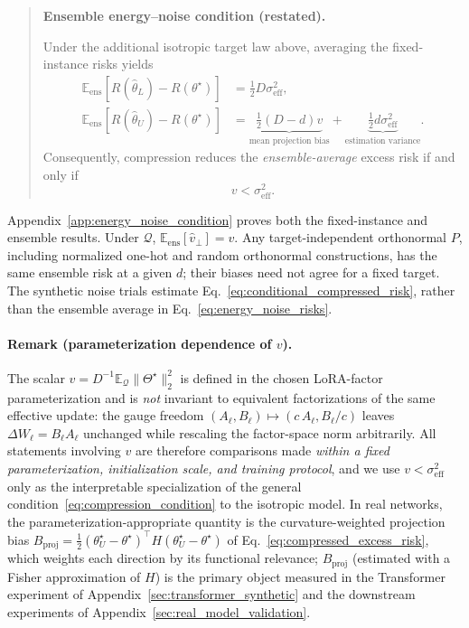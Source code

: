 \begin{quote}\textbf{Ensemble energy--noise condition (restated).}

Under the additional isotropic target law above, averaging the fixed-instance risks yields
\begin{equation}
\begin{aligned}
\mathbb E_{\mathrm{ens}}[R(\hat\theta_L)-R(\theta^\star)]&=\tfrac12D\sigma_{\mathrm{eff}}^2,\\
\mathbb E_{\mathrm{ens}}[R(\hat\theta_U)-R(\theta^\star)]&=
\underbrace{\tfrac12(D-d)v}_{\text{mean projection bias}}
+\underbrace{\tfrac12d\sigma_{\mathrm{eff}}^2}_{\text{estimation variance}}.
\end{aligned}
\label{eq:energy_noise_risks}
\end{equation}
Consequently, compression reduces the \emph{ensemble-average} excess risk if and only if
\begin{equation}
v<\sigma_{\mathrm{eff}}^2.
\label{eq:energy_noise_condition}
\end{equation}
\end{quote}
Appendix~\ref{app:energy_noise_condition} proves both the fixed-instance and ensemble results.
Under $\mathcal Q$, $\mathbb E_{\mathrm{ens}}[\hat v_\perp]=v$.
Any target-independent orthonormal $P$, including normalized one-hot and random orthonormal constructions, has the same ensemble risk at a given $d$; their biases need not agree for a fixed target.
The synthetic noise trials estimate Eq.~\eqref{eq:conditional_compressed_risk}, rather than the ensemble average in Eq.~\eqref{eq:energy_noise_risks}.

\paragraph{Remark (parameterization dependence of $v$).}
The scalar $v=D^{-1}\mathbb E_{\mathcal Q}\|\Theta^\star\|_2^2$ is defined in the chosen LoRA-factor parameterization and is \emph{not} invariant to equivalent factorizations of the same effective update: the gauge freedom $(A_\ell,B_\ell)\mapsto(c\,A_\ell,B_\ell/c)$ leaves $\Delta W_\ell=B_\ell A_\ell$ unchanged while rescaling the factor-space norm arbitrarily. All statements involving $v$ are therefore comparisons made \emph{within a fixed parameterization, initialization scale, and training protocol}, and we use $v<\sigma_{\mathrm{eff}}^2$ only as the interpretable specialization of the general condition~\eqref{eq:compression_condition} to the isotropic model. In real networks, the parameterization-appropriate quantity is the curvature-weighted projection bias $B_{\mathrm{proj}}=\frac{1}{2}(\theta^\star_U-\theta^\star)^\top H(\theta^\star_U-\theta^\star)$ of Eq.~\eqref{eq:compressed_excess_risk}, which weights each direction by its functional relevance; $B_{\mathrm{proj}}$ (estimated with a Fisher approximation of $H$) is the primary object measured in the Transformer experiment of Appendix~\ref{sec:transformer_synthetic} and the downstream experiments of Appendix~\ref{sec:real_model_validation}.

